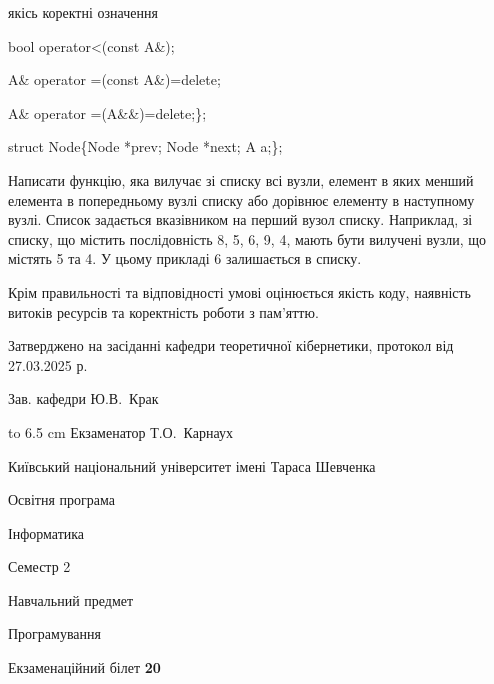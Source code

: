 \documentclass[12pt, ukrainian]{article}
\begin{document}
{\quad  якісь коректні означення 

\quad  bool operator<(const A\&); 

\quad A\& operator =(const A\&)=delete; 

\quad  A\& operator =(A\&\&)=delete;\};

struct Node\{Node *prev; Node *next; A a;\};

Написати функцію, яка вилучає зі списку всі вузли, елемент в яких менший елемента в попередньому вузлі списку або дорівнює елементу в наступному вузлі. Список задається вказівником на перший вузол списку. Наприклад, зі списку, що містить послідовність 8, 5, 6, 9, 4, мають бути вилучені вузли, що містять 5 та 4. У цьому прикладі 6 залишається в списку.

Крім правильності та відповідності умові оцінюється якість коду, наявність витоків ресурсів та коректність роботи з пам'яттю. 

}
{\smallskip\smallskip \begin {scriptsize} Затверджено на засіданні кафедри теоретичної кібернетики, протокол   від   27.03.2025 р.\par\smallskip\smallskip\smallskip\smallskip
{\parbox {6.5 cm} {Зав. кафедри \dotfill Ю.В.~Крак}}\hspace {0.7cm} {\hbox to 6.5 cm { Екзаменатор \dotfill Т.О.~Карнаух}} \end{scriptsize}}
\newpage
{{\begin {scriptsize}\par
{ \center  Київський національний університет імені Тараса Шевченка \par}
{\parbox {5 cm}{Освітня програма \hfill}{\parbox {7 cm}{Інформатика\hfill}}\parbox {6 cm}{\hfill Семестр 2}}\par
{\parbox {5 cm} {Навчальний предмет \hfill}\parbox {7 cm}{Програмування \hfill}\parbox {6cm}{\hfill}\par}\vspace{-15pt} \end{scriptsize}}{\center Екзаменаційний білет \No \textbf { 20 }\par}}
\end{document}
